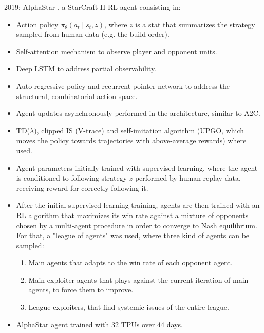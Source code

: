 \documentclass[12pt, english]{article}
\begin{document}
2019:
AlphaStar \cite{vinyals_grandmaster_2019}, a StarCraft II RL agent consisting in:

  \begin{itemize}
    \item Action policy $\pi_\theta (a_t \mid s_t, z)$, where $z$ is a stat that summarizes the strategy sampled from human data (e.g. the build order).

    \item Self-attention mechanism to observe player and opponent units.

    \item Deep LSTM to address partial observability.

    \item Auto-regressive policy and recurrent pointer network to address the structural, combinatorial action space.

    \item Agent updates asynchronously performed in the architecture, similar to A2C.

    \item TD($\lambda$), clipped IS (V-trace) and self-imitation algorithm (UPGO, which moves the policy towards trajectories with above-average rewards) where used.

    \item Agent parameters initially trained with supervised learning, where the agent is conditioned to following strategy $z$ performed by human replay data, receiving reward for correctly following it.

    \item After the initial supervised learning training, agents are then trained with an RL algorithm that maximizes its win rate against a mixture of opponents chosen by a multi-agent procedure in order to converge to Nash equilibrium. For that, a "league of agents" was used, where three kind of agents can be sampled:

    \begin{enumerate}
      \item Main agents that adapts to the win rate of each opponent agent.
      \item Main exploiter agents that plays against the current iteration of main agents, to force them to improve.
      \item League exploiters, that find systemic issues of the entire league.
    \end{enumerate}

    \item AlphaStar agent trained with 32 TPUs over 44 days.
  \end{itemize}
\end{document}

